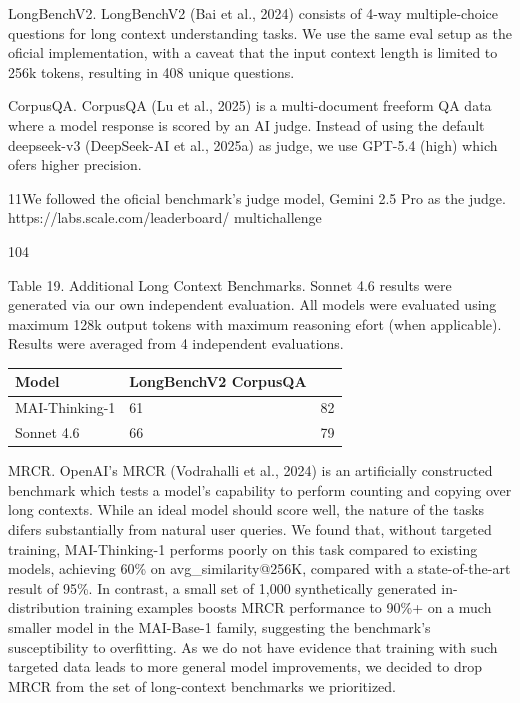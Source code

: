 \documentclass[
  10
]{article}
\newcounter{none} %
\begin{document}
LongBenchV2. LongBenchV2 (Bai et al., 2024) consists of 4-way
multiple-choice questions for long context understanding tasks. We use
the same eval setup as the oficial implementation, with a caveat that
the input context length is limited to 256k tokens, resulting in 408
unique questions.

CorpusQA. CorpusQA (Lu et al., 2025) is a multi-document freeform QA
data where a model response is scored by an AI judge. Instead of using
the default deepseek-v3 (DeepSeek-AI et al., 2025a) as judge, we use
GPT-5.4 (high) which ofers higher precision.

11We followed the oficial benchmark's judge model, Gemini 2.5 Pro as the
judge. https://labs.scale.com/leaderboard/ multichallenge

104

Table 19. Additional Long Context Benchmarks. Sonnet 4.6 results were
generated via our own independent evaluation. All models were evaluated
using maximum 128k output tokens with maximum reasoning efort (when
applicable). Results were averaged from 4 independent evaluations.

{\def\LTcaptype{none} %
\begin{longtable}[]{@{}|l|l|l|@{}}
\toprule\noalign{}
\endhead
\bottomrule\noalign{}
\endlastfoot
\hline
Model & LongBenchV2 CorpusQA & \\
\hline
MAI-Thinking-1 & 61 & 82 \\
\hline
Sonnet 4.6 & 66 & 79 \\
\hline
\end{longtable}
}

MRCR. OpenAI's MRCR (Vodrahalli et al., 2024) is an artificially
constructed benchmark which tests a model's capability to perform
counting and copying over long contexts. While an ideal model should
score well, the nature of the tasks difers substantially from natural
user queries. We found that, without targeted training, MAI-Thinking-1
performs poorly on this task compared to existing models, achieving 60\%
on avg\_similarity@256K, compared with a state-of-the-art result of
95\%. In contrast, a small set of 1,000 synthetically generated
in-distribution training examples boosts MRCR performance to 90\%+ on a
much smaller model in the MAI-Base-1 family, suggesting the benchmark's
susceptibility to overfitting. As we do not have evidence that training
with such targeted data leads to more general model improvements, we
decided to drop MRCR from the set of long-context benchmarks we
prioritized.
\end{document}
